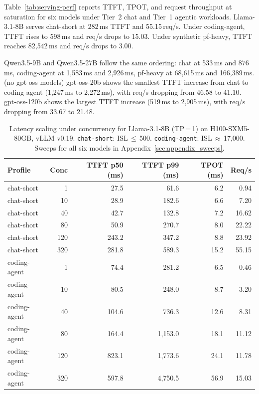 Table~\ref{tab:serving-perf} reports TTFT, TPOT, and request throughput at saturation for six models under Tier~2 chat and Tier~1 agentic workloads. Llama-3.1-8B serves chat-short at 282\,ms TTFT and 55.15\,req/s. Under coding-agent, TTFT rises to 598\,ms and req/s drops to 15.03. Under synthetic pf-heavy, TTFT reaches 82{,}542\,ms and req/s drops to 3.00.

Qwen3.5-9B and Qwen3.5-27B follow the same ordering: chat at 533\,ms and 876\,ms, coding-agent at 1{,}583\,ms and 2{,}926\,ms, pf-heavy at 68{,}615\,ms and 166{,}389\,ms. (no gpt oss models) gpt-oss-20b shows the smallest TTFT increase from chat to coding-agent (1{,}247\,ms to 2{,}272\,ms), with req/s dropping from 46.58 to 41.10. gpt-oss-120b shows the largest TTFT increase (519\,ms to 2{,}905\,ms), with req/s dropping from 33.67 to 21.48.

\begin{table}[t]
\caption{Latency scaling under concurrency for Llama-3.1-8B (TP\,=\,1) on H100-SXM5-80GB, vLLM v0.19. \texttt{chat-short}: ISL\,$\leq$\,500. \texttt{coding-agent}: ISL\,$\approx$\,17{,}000. Sweeps for all six models in Appendix~\ref{sec:appendix_sweeps}.}
\label{tab:concurrency-sweep}
\centering
\small
\setlength{\tabcolsep}{4pt}
\begin{tabular}{@{}l r rr r r@{}}
\toprule
\textbf{Profile} & \textbf{Conc} & \textbf{TTFT p50 (ms)} & \textbf{TTFT p99 (ms)} & \textbf{TPOT (ms)} & \textbf{Req/s} \\
\midrule
chat-short  &   1 &  27.5 &    61.6 &  6.2 &  0.94 \\
chat-short  &  10 &  28.9 &   182.6 &  6.6 &  7.20 \\
chat-short  &  40 &  42.7 &   132.8 &  7.2 & 16.62 \\
chat-short  &  80 &  50.9 &   270.7 &  8.0 & 22.22 \\
chat-short  & 120 & 243.2 &   347.2 &  8.8 & 23.92 \\
chat-short  & 320 & 281.8 &   589.3 & 15.2 & 55.15 \\
\midrule
coding-agent &   1 &  74.4 &   281.2 &  6.5 &  0.46 \\
coding-agent &  10 &  80.5 &   248.0 &  8.7 &  3.20 \\
coding-agent &  40 & 104.6 &   736.3 & 12.6 &  8.31 \\
coding-agent &  80 & 164.4 & 1{,}153.0 & 18.1 & 11.12 \\
coding-agent & 120 & 823.1 & 1{,}773.6 & 24.1 & 11.78 \\
coding-agent & 320 & 597.8 & 4{,}750.5 & 56.9 & 15.03 \\
\bottomrule
\end{tabular}
\end{table}


